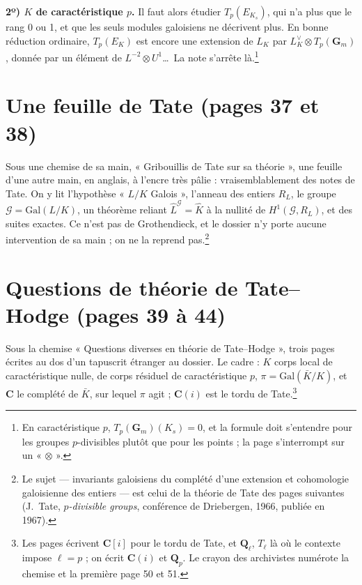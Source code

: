 \documentclass[11pt,a4paper]{article}
\begin{document}
\textbf{2º) $K$ de caractéristique $p$.} Il faut alors étudier $T_p(E_{K_s})$,
qui n'a plus que le rang 0 ou 1, et que les seuls modules galoisiens ne
décrivent plus. En bonne réduction ordinaire, $T_p(E_K)$ est encore une
extension de $L_K$ par $L_K^\vee \otimes T_p(\mathbf{G}_m)$, donnée par un
élément de $L^{-2} \otimes U^1$\ldots\ La note s'arrête là.\footnote{En
caractéristique $p$, $T_p(\mathbf{G}_m)(K_s) = 0$, et la formule doit
s'entendre pour les groupes $p$-divisibles plutôt que pour les points ; la
page s'interrompt sur un « $\otimes$ ».}

\section*{Une feuille de Tate (pages 37 et 38)}

Sous une chemise de sa main, « Gribouillis de Tate sur sa théorie », une feuille
d'une autre main, en anglais, à l'encre très pâlie : vraisemblablement des notes
de Tate. On y lit l'hypothèse « $L/K$ Galois », l'anneau des entiers $R_L$, le
groupe $\mathcal{G} = \mathrm{Gal}(L/K)$, un théorème reliant
$\widehat{L}^{\mathcal{G}} = \widehat{K}$ à la nullité de
$H^1(\mathcal{G}, R_L)$, et des suites exactes. Ce n'est pas de Grothendieck,
et le dossier n'y porte aucune intervention de sa main ; on ne la reprend
pas.\footnote{Le sujet — invariants galoisiens du complété d'une extension et
cohomologie galoisienne des entiers — est celui de la théorie de Tate des
pages suivantes (J.~Tate, \emph{$p$-divisible groups}, conférence de Driebergen,
1966, publiée en 1967).}

\section*{Questions de théorie de Tate--Hodge (pages 39 à 44)}

Sous la chemise « Questions diverses en théorie de Tate--Hodge », trois pages
écrites au dos d'un tapuscrit étranger au dossier. Le cadre : $K$ corps local
de caractéristique nulle, de corps résiduel de caractéristique $p$,
$\pi = \mathrm{Gal}(\bar K/K)$, et $\mathbf{C}$ le complété de $\bar K$, sur
lequel $\pi$ agit ; $\mathbf{C}(i)$ est le tordu de Tate.\footnote{Les pages
écrivent $\mathbf{C}[i]$ pour le tordu de Tate, et
$\mathbf{Q}_\ell$, $T_\ell$ là où le contexte impose $\ell = p$ ; on écrit
$\mathbf{C}(i)$ et $\mathbf{Q}_p$. Le crayon des archivistes numérote la
chemise et la première page 50 et 51.}
\end{document}
